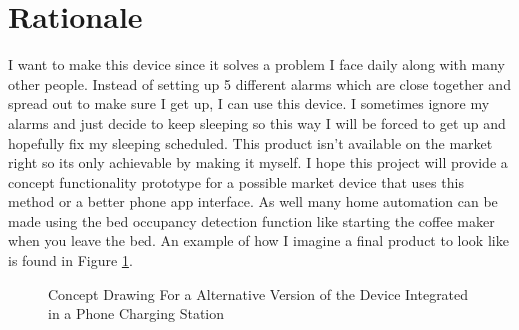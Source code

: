 \documentclass[11pt]{article}
\begin{document}
\section{Rationale}
I want to make this device since it solves a problem I face daily along with many other people.
Instead of setting up 5 different alarms which are close together and spread out to make sure I get up, I can use this device.
I sometimes ignore my alarms and just decide to keep sleeping so this way I will be forced to get up and hopefully fix my sleeping scheduled.
This product isn't available on the market right so its only achievable by making it myself.
I hope this project will provide a concept functionality prototype for a possible market device that uses this method or a better phone app interface. 
As well many home automation can be made using the bed occupancy detection function like starting the coffee maker when you leave the bed.
An example of how I imagine a final product to look like is found in Figure \ref{fig:market}.

\begin{figure}[H]
	\centering
	\caption{Concept Drawing For a Alternative Version of the Device Integrated in a Phone Charging Station}
	\label{fig:market}
\end{figure}
\end{document}
